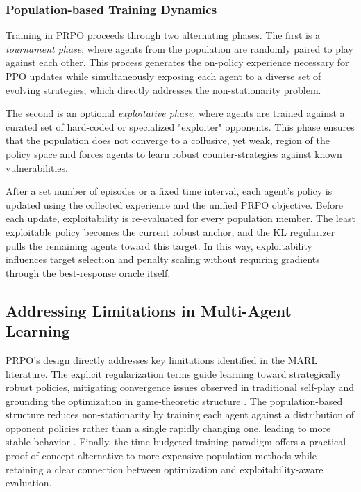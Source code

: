 \documentclass[sigconf,anonymous]{aamas}
\begin{document}
\subsubsection{Population-based Training Dynamics}
Training in PRPO proceeds through two alternating phases. The first is a \textit{tournament phase}, where agents from the population are randomly paired to play against each other. This process generates the on-policy experience necessary for PPO updates while simultaneously exposing each agent to a diverse set of evolving strategies, which directly addresses the non-stationarity problem.

The second is an optional \textit{exploitative phase}, where agents are trained against a curated set of hard-coded or specialized "exploiter" opponents. This phase ensures that the population does not converge to a collusive, yet weak, region of the policy space and forces agents to learn robust counter-strategies against known vulnerabilities.

After a set number of episodes or a fixed time interval, each agent's policy is updated using the collected experience and the unified PRPO objective. Before each update, exploitability is re-evaluated for every population member. The least exploitable policy becomes the current robust anchor, and the KL regularizer pulls the remaining agents toward this target. In this way, exploitability influences target selection and penalty scaling without requiring gradients through the best-response oracle itself.

\subsection{Addressing Limitations in Multi-Agent Learning}
PRPO's design directly addresses key limitations identified in the MARL literature. The explicit regularization terms guide learning toward strategically robust policies, mitigating convergence issues observed in traditional self-play and grounding the optimization in game-theoretic structure \cite{Panait2005, Hu2003}. The population-based structure reduces non-stationarity by training each agent against a distribution of opponent policies rather than a single rapidly changing one, leading to more stable behavior \cite{Lanctot2017}. Finally, the time-budgeted training paradigm offers a practical proof-of-concept alternative to more expensive population methods while retaining a clear connection between optimization and exploitability-aware evaluation.
\end{document}

